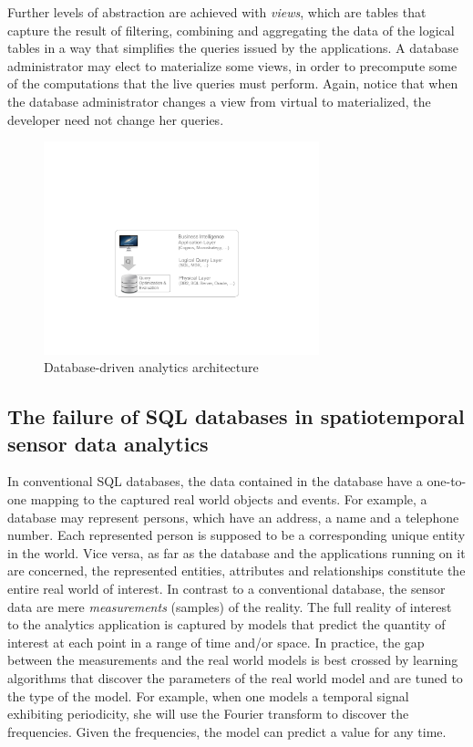 Further levels of abstraction are achieved with {\em views}, which are tables that capture the result of filtering, combining and aggregating the data of the logical tables in a way that simplifies the queries issued by the applications. A database administrator may elect to materialize some views, in order to precompute some of the computations that the live queries must perform. Again, notice that when the database administrator changes a view from virtual to materialized, the developer need not change her queries.

\begin{figure}
\center
\includegraphics[width=8cm]{fig-dbms.pdf}
\caption{Database-driven analytics architecture}
\label{fig:db-driven-arch}
\vspace*{-0.5cm}
\end{figure}

\subsection{The failure of SQL databases in spatiotemporal sensor data analytics}
\label{sec:the-failure}
In conventional SQL databases, the data contained in the database have a one-to-one mapping to the captured real world objects and events. For example, a database may represent persons, which have an address, a name and a telephone number. Each represented person is supposed to be a corresponding unique entity in the world. Vice versa, as far as the database and the applications running on it are concerned, the represented entities, attributes and relationships constitute the entire real world of interest. In contrast to a conventional database, the sensor data are mere {\em measurements} (samples) of the reality. The full reality of interest to the analytics application is captured by models that predict the quantity of interest at each point in a range of time and/or space. In practice, the gap between the measurements and the real world models is best crossed by learning algorithms that discover the parameters of the real world model and are tuned to the type of the model. For example, when one models a temporal signal exhibiting periodicity, she will use the Fourier transform to discover the frequencies. Given the frequencies, the model can predict a value for any time.

